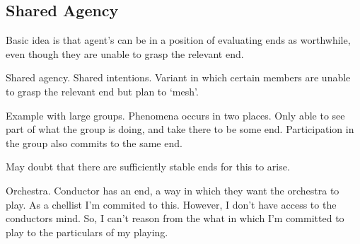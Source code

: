 \documentclass[10pt]{article}
\begin{document}
\subsection{Shared Agency}
\label{sec:shared-agency}

Basic idea is that agent's can be in a position of evaluating ends as worthwhile, even though they are unable to grasp the relevant end.

Shared agency.
Shared intentions.
Variant in which certain members are unable to grasp the relevant end but plan to `mesh'.

Example with large groups.
Phenomena occurs in two places.
Only able to see part of what the group is doing, and take there to be some end.
Participation in the group also commits to the same end.

May doubt that there are sufficiently stable ends for this to arise.

Orchestra.
Conductor has an end, a way in which they want the orchestra to play.
As a chellist I'm commited to this.
However, I don't have access to the conductors mind.
So, I can't reason from the what in which I'm committed to play to the particulars of my playing.
\end{document}
